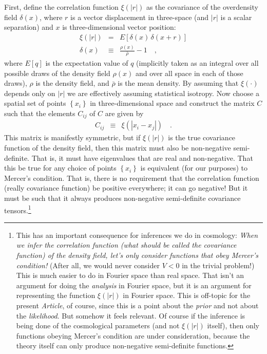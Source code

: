 \documentclass[12pt, letterpaper, preprint]{aastex}
\newcommand{\setof}[1]{\left\{{#1}\right\}}
\newcommand{\documentname}{\textsl{Article}}
\begin{document}
First, define the correlation function $\xi(|r|)$ as the covariance of
the overdensity field $\delta(x)$, where $r$ is a vector displacement
in three-space (and $|r|$ is a scalar separation) and $x$ is
three-dimensional vector position:
\begin{eqnarray}
\xi(|r|) &=& E[\delta(x)\,\delta(x+r)]
\\
\delta(x) &\equiv& \frac{\rho(x)}{\bar{\rho}} - 1
\quad ,
\end{eqnarray}
where $E[q]$ is the expectation value of $q$ (implicitly taken as an integral
over all possible draws of the density field $\rho(x)$ and over all space in each of those draws),
$\rho$ is the density field,
and $\bar{\rho}$ is the mean density.
By assuming that $\xi(\cdot)$ depends only on $|r|$ we are effectively
assuming statistical isotropy.
Now choose a spatial set of points $\setof{x_i}$ in three-dimensional space
and construct the matrix $C$ such that the elements $C_{ij}$ of $C$
are given by
\begin{eqnarray}
C_{ij} &\equiv& \xi(|x_i - x_j|)
\quad .
\end{eqnarray}
This matrix is manifestly symmetric, but if $\xi(|r|)$ is the true
covariance function of the density field, then this matrix must also
be non-negative semi-definite.
That is, it must have eigenvalues that are real and non-negative.
That this be true for any choice of points $\setof{x_i}$ is equivalent
(for our purposes) to Mercer's condition.
That is, there is no requirement that the correlation function (really
covariance function) be positive everywhere; it can go negative!
But it must be such that it always produces non-negative semi-definite
covariance tensors.\footnote{This has an important consequence for
  inferences we do in cosmology: \emph{When we infer the correlation
    function (what should be called the covariance function) of the
    density field, let's only consider functions that obey Mercer's
    condition!}  (After all, we would never consider $V<0$ in the
  trivial problem!)  This is much easier to do in Fourier space than
  real space.  That isn't an argument for doing the \emph{analysis} in
  Fourier space, but it is an argument for representing the function
  $\xi(|r|)$ in Fourier space. This is off-topic for the present
  \documentname, of course, since this is a point about the
  \emph{prior} and not about the \emph{likelihood}. But somehow it
  feels relevant. Of course if the inference is being done of the
  cosmological parameters (and not $\xi(|r|)$ itself), then only
  functions obeying Mercer's condition are under consideration,
  because the theory itself can only produce non-negative
  semi-definite functions.}
\end{document}
